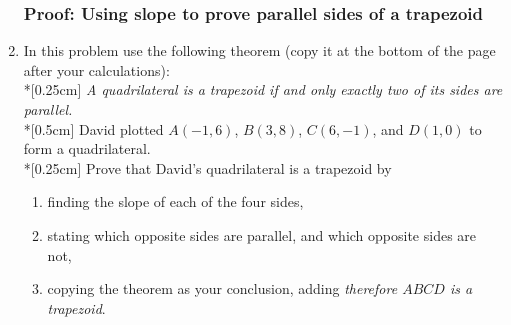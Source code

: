 \documentclass[12pt, twoside]{article}
\begin{document}
\begin{enumerate}
  \subsubsection*{Proof: Using slope to prove parallel sides of a trapezoid}
  \item In this problem use the following theorem (copy it at the bottom of the page after your calculations): \\*[0.25cm]
  \emph{A quadrilateral is a trapezoid if and only exactly two of its sides are parallel.}\\*[0.5cm]
  David plotted $A(-1,6)$, $B(3,8)$, $C(6,-1)$, and $D(1,0)$ to form a quadrilateral. \\*[0.25cm]
  Prove that David's quadrilateral is a trapezoid by
  \begin{enumerate}
    \item finding the slope of each of the four sides,
    \item stating which opposite sides are parallel, and which opposite sides are not,
    \item copying the theorem as your conclusion, adding \emph{therefore $ABCD$ is a trapezoid}.
  \end{enumerate}
  \begin{flushright} %
  \end{flushright}

\end{enumerate}
\end{document}
